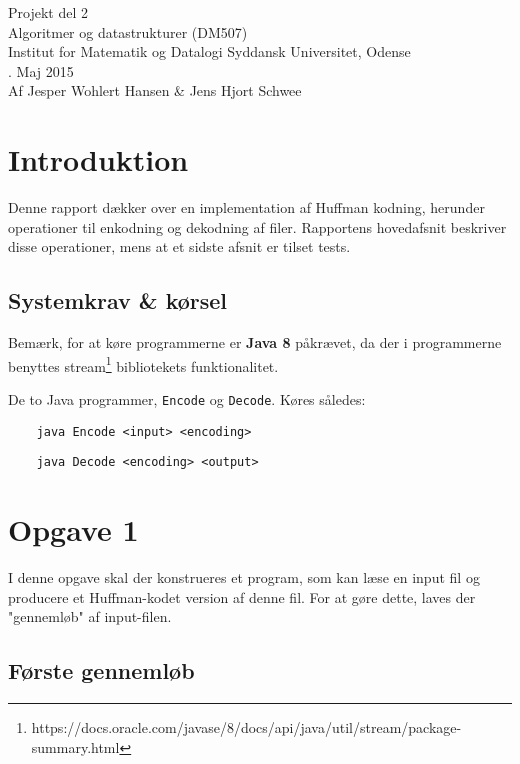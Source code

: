 \documentclass{article}
\begin{document}
{\centering
\huge
Projekt del 2\\
Algoritmer og datastrukturer (DM507)\\
\large
\bigskip
Institut for Matematik og Datalogi Syddansk Universitet, Odense\\
. Maj 2015\\
\bigskip
Af Jesper Wohlert Hansen \& Jens Hjort Schwee\\
}
\newpage

\section*{Introduktion}
Denne rapport dækker over en implementation af Huffman kodning, herunder operationer til enkodning og dekodning af filer. Rapportens hovedafsnit beskriver disse operationer, mens at et sidste afsnit er tilset tests.

\subsection*{Systemkrav \& kørsel}
Bemærk, for at køre programmerne er \textbf{Java 8} påkrævet, da der i programmerne benyttes stream\footnote{https://docs.oracle.com/javase/8/docs/api/java/util/stream/package-summary.html} bibliotekets funktionalitet.

\bigskip

De to Java programmer, \texttt{Encode} og \texttt{Decode}. Køres således:

\begin{verbatim}
    java Encode <input> <encoding>
\end{verbatim}

\begin{verbatim}
    java Decode <encoding> <output>
\end{verbatim}

\newpage

\section*{Opgave 1}
I denne opgave skal der konstrueres et program, som kan læse en input fil og producere et Huffman-kodet version af denne fil. For at gøre dette, laves der "gennemløb" af input-filen.

\subsection*{Første gennemløb}
\end{document}
